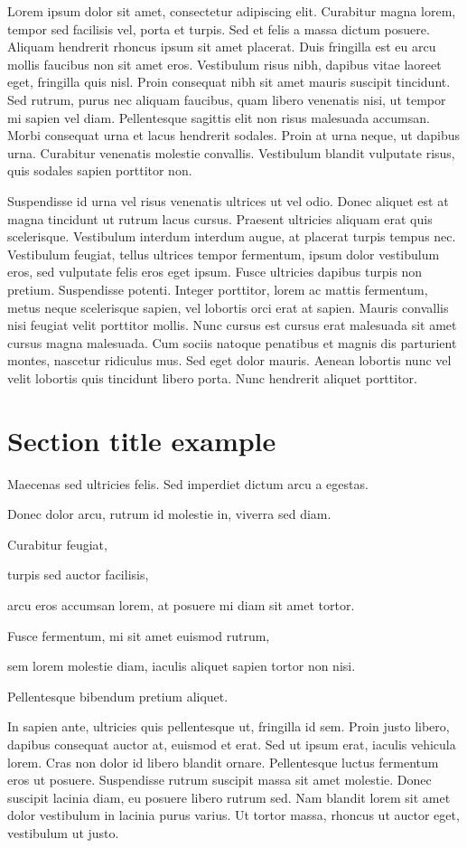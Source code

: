 \documentclass[twoside]{article}
\begin{document}
\begin{multicols}{2}
\lettrine[nindent=0em,lines=3]{L} orem ipsum dolor sit amet, consectetur adipiscing elit. Curabitur magna lorem, tempor sed facilisis vel, porta et turpis. Sed et felis a massa dictum posuere. Aliquam hendrerit rhoncus ipsum sit amet placerat. Duis fringilla est eu arcu mollis faucibus non sit amet eros. Vestibulum risus nibh, dapibus vitae laoreet eget, fringilla quis nisl. Proin consequat nibh sit amet mauris suscipit tincidunt. Sed rutrum, purus nec aliquam faucibus, quam libero venenatis nisi, ut tempor mi sapien vel diam. Pellentesque sagittis elit non risus malesuada accumsan. Morbi consequat urna et lacus hendrerit sodales. Proin at urna neque, ut dapibus urna. Curabitur venenatis molestie convallis. Vestibulum blandit vulputate risus, quis sodales sapien porttitor non.

Suspendisse id urna vel risus venenatis ultrices ut vel odio. Donec aliquet est at magna tincidunt ut rutrum lacus cursus. Praesent ultricies aliquam erat quis scelerisque. Vestibulum interdum interdum augue, at placerat turpis tempus nec. Vestibulum feugiat, tellus ultrices tempor fermentum, ipsum dolor vestibulum eros, sed vulputate felis eros eget ipsum. Fusce ultricies dapibus turpis non pretium. Suspendisse potenti. Integer porttitor, lorem ac mattis fermentum, metus neque scelerisque sapien, vel lobortis orci erat at sapien. Mauris convallis nisi feugiat velit porttitor mollis. Nunc cursus est cursus erat malesuada sit amet cursus magna malesuada. Cum sociis natoque penatibus et magnis dis parturient montes, nascetur ridiculus mus. Sed eget dolor mauris. Aenean lobortis nunc vel velit lobortis quis tincidunt libero porta. Nunc hendrerit aliquet porttitor.

\section{Section title example}
Maecenas sed ultricies felis. Sed imperdiet dictum arcu a egestas. 
\begin{compactitem}
\item Donec dolor arcu, rutrum id molestie in, viverra sed diam.
\item Curabitur feugiat, 
\item turpis sed auctor facilisis, 
\item arcu eros accumsan lorem, at posuere mi diam sit amet tortor. 
\item Fusce fermentum, mi sit amet euismod rutrum, 
\item sem lorem molestie diam, iaculis aliquet sapien tortor non nisi. \item Pellentesque bibendum pretium aliquet. 
\end{compactitem}
In sapien ante, ultricies quis pellentesque ut, fringilla id sem. Proin justo libero, dapibus consequat auctor at, euismod et erat. Sed ut ipsum erat, iaculis vehicula lorem. Cras non dolor id libero blandit ornare. Pellentesque luctus fermentum eros ut posuere. Suspendisse rutrum suscipit massa sit amet molestie. Donec suscipit lacinia diam, eu posuere libero rutrum sed. Nam blandit lorem sit amet dolor vestibulum in lacinia purus varius. Ut tortor massa, rhoncus ut auctor eget, vestibulum ut justo.


\end{multicols}
\end{document}
